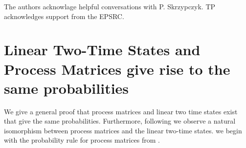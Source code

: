 \documentclass[aps,pra, twocolumn]{revtex4-1}
\begin{document}
The authors acknowlage helpful conversations with P. Skrzypczyk. TP acknowledges support from the EPSRC. 

%


\onecolumngrid
\appendix
\newpage

\section{Linear Two-Time States and Process Matrices give rise to the same probabilities} \label{ap:lineartwotime} 
We give a general proof that process matrices and linear two time states exist that give the same probabilities. Furthermore, following \cite{connectingprocesandtwotime} we observe a natural isomorphism between process matrices and the linear two-time states. we begin with the probability rule for process matrices from \cite{Oreshkov2016}.
\end{document}

